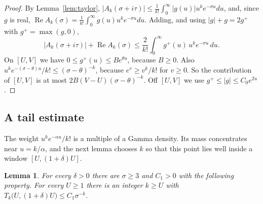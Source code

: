 \documentclass[11pt]{amsart}
\newcommand{\re}{\operatorname{Re}}
\theoremstyle{plain}
\newtheorem{lemma}[theorem]{Lemma}
\theoremstyle{definition}
\numberwithin{equation}{section}
\begin{document}
\begin{proof}
By Lemma~\ref{lem:taylor}, $|A_k(\sigma+i\tau)|\le\frac1{k!}\int_0^\infty|g(u)|u^ke^{-\sigma u}du$, and,
since $g$ is real, $\re A_k(\sigma)=\frac1{k!}\int_0^\infty g(u)u^ke^{-\sigma u}du$. Adding, and
using $|g|+g=2g^+$ with $g^+=\max(g,0)$,
\[
|A_k(\sigma+i\tau)|+\re A_k(\sigma)\le\frac{2}{k!}\int_0^\infty g^+(u)\,u^ke^{-\sigma u}\,du.
\]
On $[U,V]$ we have $0\le g^+(u)\le Be^{\theta u}$, because $B\ge0$. Also
$u^ke^{-(\sigma-\theta)u}/k!\le(\sigma-\theta)^{-k}$, because $e^{v}\ge v^k/k!$ for $v\ge0$. So the
contribution of $[U,V]$ is at most $2B(V-U)(\sigma-\theta)^{-k}$. Off $[U,V]$ we use
$g^+\le|g|\le C_0e^{2u}$.
\end{proof}

\subsection{A tail estimate}

The weight $u^ke^{-\alpha u}/k!$ is a multiple of a Gamma density. Its mass concentrates near
$u=k/\alpha$, and the next lemma chooses $k$ so that this point lies well inside a window
$[U,(1+\delta)U]$.

\begin{lemma}\label{lem:tails}
For every $\delta>0$ there are $\sigma\ge3$ and $C_1>0$ with the following property. For every
$U\ge1$ there is an integer $k\ge U$ with $T_k\bigl(U,(1+\delta)U\bigr)\le C_1\sigma^{-k}$.
\end{lemma}
\end{document}
